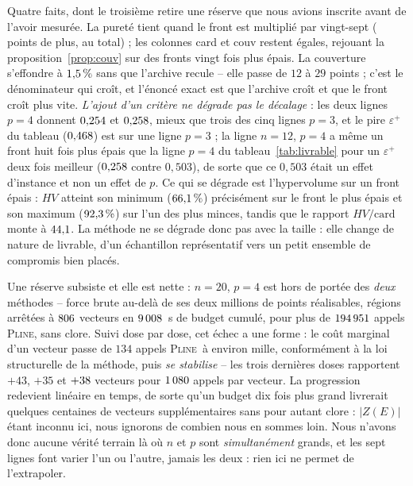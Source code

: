\documentclass[11pt,a4paper]{article}
\theoremstyle{plain}
\theoremstyle{remark}
\newcommand{\ILP}{\textsc{Pline}}
\begin{document}
\noindent
Quatre faits, dont le troisième retire une réserve que nous avions inscrite
avant de l'avoir mesurée. La pureté tient quand le front est multiplié par
vingt-sept (\puretePtsGrand{} points de plus, \puretePtsTotal{} au total) ;
les colonnes card et couv restent égales, rejouant la
proposition~\ref{prop:couv} sur des fronts vingt fois plus épais. La
couverture s'effondre à $1{,}5{}\,\%$ sans que l'archive recule --
elle passe de $12$ à $29$ points ; c'est le dénominateur qui croît, et
l'énoncé exact est que l'archive croît et que le front croît plus vite.
\emph{L'ajout d'un critère ne dégrade pas le décalage} : les deux lignes
$p=4$ donnent $0{,}254{}$ et $0{,}258{}$, mieux que trois
des cinq lignes $p=3$, et le pire $\varepsilon^+$ du tableau
($0{,}468{}$) est sur une ligne $p=3$ ; la ligne $n=12$, $p=4$ a même
un front huit fois plus épais que la ligne $p=4$ du
tableau~\ref{tab:livrable} pour un $\varepsilon^+$ deux fois meilleur
($0{,}258{}$ contre $0{,}503$), de sorte que ce $0{,}503$ était un effet
d'instance et non un effet de $p$. Ce qui se dégrade est l'hypervolume sur
un front épais : $HV$ atteint son minimum ($66{,}1{}\,\%$) précisément
sur le front le plus épais et son maximum ($92{,}3{}\,\%$) sur l'un des
plus minces, tandis que le rapport $HV/\text{card}$ monte à
$44{,}1{}$. La méthode ne se dégrade donc pas avec la taille :
elle change de nature de livrable, d'un échantillon représentatif vers un
petit ensemble de compromis bien placés.

Une réserve subsiste et elle est nette : $n=20$, $p=4$ est hors de portée
des \emph{deux} méthodes -- force brute au-delà de ses deux millions de
points réalisables, régions arrêtées à $806{}$ vecteurs en
$9\,008{}$~s de budget cumulé, pour plus de $194\,951{}$
appels \ILP, sans clore. Suivi dose par dose, cet échec a une forme : le
coût marginal d'un vecteur passe de $134$ appels \ILP\ à environ mille,
conformément à la loi structurelle de la méthode, puis \emph{se stabilise}
-- les trois dernières doses rapportent $+43$, $+35$ et
$+38{}$ vecteurs pour $1\,080{}$ appels par vecteur.
La progression redevient linéaire en temps, de sorte qu'un budget dix fois
plus grand livrerait quelques centaines de vecteurs supplémentaires sans
pour autant clore : $|Z(E)|$ étant inconnu ici, nous ignorons de combien
nous en sommes loin. Nous n'avons donc aucune vérité terrain là où $n$ et
$p$ sont \emph{simultanément} grands, et les sept lignes font varier l'un
ou l'autre, jamais les deux : rien ici ne permet de l'extrapoler.
\end{document}
